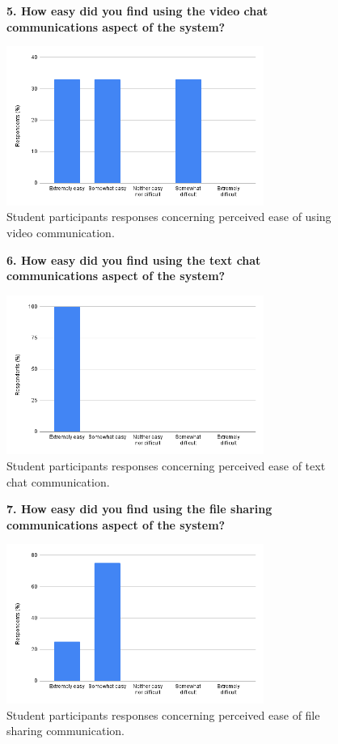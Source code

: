 \begin{figure}[H]
    \centering
    \textbf{5. How easy did you find using the video chat communications aspect of the system?}\par\medskip
    \includegraphics[width=0.75\textwidth]{10evaluation/images/stud5.png}
    \caption{Student participants responses concerning perceived ease of using video communication.}
    \label{fig:stud5}
\end{figure}

\begin{figure}[H]
    \centering
    \textbf{6. How easy did you find using the text chat communications aspect of the system?}\par\medskip
    \includegraphics[width=0.75\textwidth]{10evaluation/images/stud6.png}
    \caption{Student participants responses concerning perceived ease of text chat communication.}
    \label{fig:stud6}
\end{figure}

\begin{figure}[H]
    \centering
    \textbf{7. How easy did you find using the file sharing communications aspect of the system?}\par\medskip
    \includegraphics[width=0.75\textwidth]{10evaluation/images/stud7.png}
    \caption{Student participants responses concerning perceived ease of file sharing communication.}
    \label{fig:stud7}
\end{figure}

